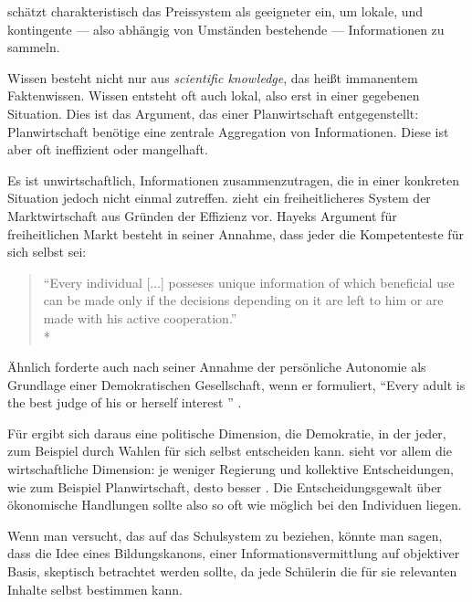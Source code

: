 \citeauthor{hayek-1945} schätzt charakteristisch das Preissystem als geeigneter ein, um lokale, und kontingente --- also abhängig von Umständen bestehende --- Informationen zu sammeln.

Wissen besteht nicht nur aus \emph{scientific knowledge}, das heißt immanentem Faktenwissen.
Wissen entsteht oft auch lokal, also erst in einer gegebenen Situation.
Dies ist das Argument, das \citeauthor{hayek-1945} einer Planwirtschaft entgegenstellt:
Planwirtschaft benötige eine zentrale Aggregation von Informationen.
Diese ist aber oft ineffizient oder mangelhaft.

Es ist unwirtschaftlich, Informationen zusammenzutragen, die in einer konkreten Situation jedoch nicht einmal zutreffen.
\citeauthor{hayek-1945} zieht ein freiheitlicheres System der Marktwirtschaft aus Gründen der Effizienz vor.
Hayeks Argument für freiheitlichen Markt besteht in seiner Annahme, dass jeder die Kompetenteste für sich selbst sei:

\begin{quote}
	``Every individual [...] posseses unique information of which beneficial use can be made only if the decisions depending on it are left to him or are made with his active cooperation.''\\*
	\parencite[521]{hayek-1945}
\end{quote}

Ähnlich forderte \citeauthor{Dahl-1989-aa} auch nach seiner Annahme der persönliche Autonomie als Grundlage einer Demokratischen Gesellschaft, wenn er formuliert,
``Every adult is the best judge of his or herself interest '' \parencite[100]{Dahl-1989-aa}.

Für \citeauthor{Dahl-1989-aa} ergibt sich daraus eine politische Dimension, die Demokratie, in der jeder, zum Beispiel durch Wahlen für sich selbst entscheiden kann.
\citeauthor{hayek-1945} sieht vor allem die wirtschaftliche Dimension: je weniger Regierung und kollektive Entscheidungen, wie zum Beispiel Planwirtschaft, desto besser \parencite[527f.]{hayek-1945}.
Die Entscheidungsgewalt über ökonomische Handlungen sollte also so oft wie möglich bei den Individuen liegen.

Wenn man versucht, das auf das Schulsystem zu beziehen, könnte man sagen, dass die Idee eines Bildungskanons, einer Informationsvermittlung auf objektiver Basis, skeptisch betrachtet werden sollte, da jede Schülerin die für sie relevanten Inhalte selbst bestimmen kann.
